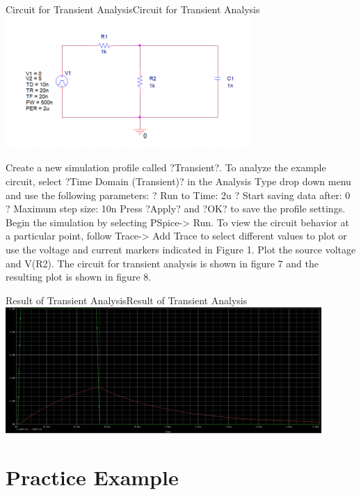 \documentclass[12pt]{../manual}
\begin{document}
\begin{myfigure}[colback=white,label=fig:trans]{Circuit for Transient Analysis}{Circuit for Transient Analysis}
\centering
\includegraphics[width=0.7\textwidth]{figures/TransientAnalysisCircuitCrop.PNG}
\end{myfigure}

Create a new simulation profile called ?Transient?. To analyze the example circuit, select ?Time Domain (Transient)? in the Analysis Type drop down menu and use the following parameters:
? Run to Time: 2u
? Start saving data after: 0
? Maximum step size: 10n
Press ?Apply? and ?OK? to save the profile settings. Begin the simulation by selecting PSpice-> Run. To view the circuit behavior at a particular point, follow Trace-> Add Trace to select different values to plot or use the voltage and current markers indicated in Figure 1. Plot the source voltage and V(R2). The circuit for transient analysis is shown in figure 7 and the resulting plot is shown in figure 8.

\begin{myfigure}[label=fig:transAnalRes]{Result of Transient Analysis}{Result of Transient Analysis}
\centering
\includegraphics[width=0.9\textwidth]{figures/ResultTransientAnalysisCrop.PNG}
\end{myfigure}
%
\section{Practice Example}
\end{document}
